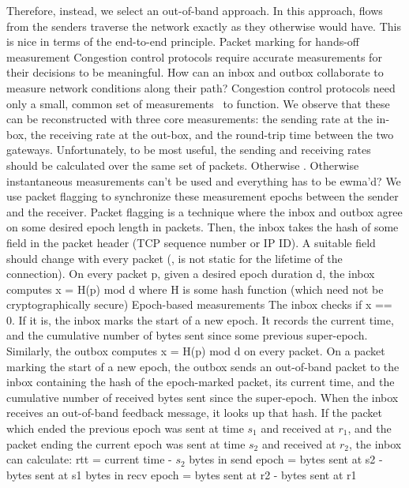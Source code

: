 \begin{outline}
    \2 Therefore, instead, we select an out-of-band approach. In this approach, flows from the senders traverse the network exactly as they otherwise would have. This is nice in terms of the end-to-end principle.
\1 Packet marking for hands-off measurement
    \2 Congestion control protocols require accurate measurements for their decisions to be meaningful. How can an inbox and outbox collaborate to measure network conditions along their path?
    \2 Congestion control protocols need only a small, common set of measurements~\cite{ccp-hotnets} to function. We observe that these can be reconstructed with three core measurements: the sending rate at the in-box, the receiving rate at the out-box, and the round-trip time between the two gateways.
    \2 Unfortunately, to be most useful, the sending and receiving rates should be calculated over the same set of packets. Otherwise .
        \3 Otherwise instantaneous measurements can't be used and everything has to be ewma'd?
    \2 We use packet flagging to synchronize these measurement epochs between the sender and the receiver.
    \2 Packet flagging is a technique where the inbox and outbox agree on some desired epoch length in packets.
    \2 Then, the inbox takes the hash of some field in the packet header (\eg TCP sequence number or IP ID).   
        \3 A suitable field should change with every packet (\ie, is not static for the lifetime of the connection).
        \3 On every packet p, given a desired epoch duration d, the inbox computes x = H(p) mod d where H is some hash function (which need not be cryptographically secure)
    \2 Epoch-based measurements
        \3 The inbox checks if x == 0. If it is, the inbox marks the start of a new epoch. It records the current time, and the cumulative number of bytes sent since some previous super-epoch.
        \3 Similarly, the outbox computes x = H(p) mod d on every packet. On a packet marking the start of a new epoch, the outbox sends an out-of-band packet to the inbox containing the hash of the epoch-marked packet, its current time, and the cumulative number of received bytes sent since the super-epoch.
        \3 When the inbox receives an out-of-band feedback message, it looks up that hash. If the packet which ended the previous epoch was sent at time $s_1$ and received at $r_1$, and the packet ending the current epoch was sent at time $s_2$ and received at $r_2$, the inbox can calculate:
            \4 rtt = current time - $s_2$
            \4 bytes in send epoch = bytes sent at s2 - bytes sent at s1
            \4 bytes in recv epoch = bytes sent at r2 - bytes sent at r1

\end{outline}

